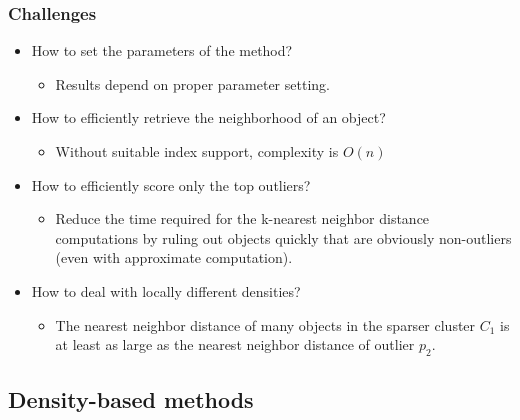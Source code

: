 \documentclass{article}
\begin{document}
\subsubsection{Challenges}
\begin{itemize}
  \item How to set the parameters of the method?
  \begin{itemize}
    \item Results depend on proper parameter setting.
  \end{itemize}

  \item How to efficiently retrieve the neighborhood of an object?
  \begin{itemize}
    \item Without suitable index support, complexity is $O(n)$
  \end{itemize}

  \item How to efficiently score only the top outliers?
  \begin{itemize}
    \item Reduce the time required for the k-nearest neighbor distance computations by ruling out objects quickly that are obviously non-outliers (even with approximate computation).
  \end{itemize}

  \item How to deal with locally different densities?
  \begin{itemize}
    \item The nearest neighbor distance of many objects in the sparser cluster $C_1$ is at least as large as the nearest neighbor distance of outlier $p_2$.
  \end{itemize}
\end{itemize}

\newpage

\subsection{Density-based methods}
\end{document}
